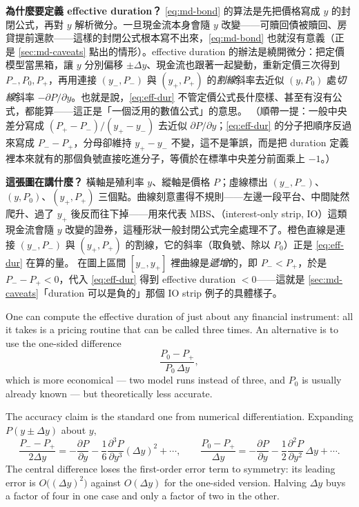 \suppstart
\begin{remark}
	\textbf{為什麼要定義 effective duration？} \eqref{eq:md-bond} 的算法是先把價格寫成 $y$ 的封閉公式，再對 $y$ 解析微分。一旦現金流本身會隨 $y$ 改變——可贖回債被贖回、房貸提前還款——這樣的封閉公式根本寫不出來，\eqref{eq:md-bond} 也就沒有意義（正是 \autoref{sec:md-caveats} 點出的情形）。effective duration 的辦法是繞開微分：把定價模型當黑箱，讓 $y$ 分別偏移 $\pm\Delta y$、現金流也跟著一起變動，重新定價三次得到 $P_{-},P_{0},P_{+}$，再用連接 $(y_{-},P_{-})$ 與 $(y_{+},P_{+})$ 的\emph{割線}斜率去近似 $(y,P_{0})$ 處\emph{切線}斜率 $-\partial P/\partial y$。也就是說，\eqref{eq:eff-dur} 不管定價公式長什麼樣、甚至有沒有公式，都能算——這正是「一個泛用的數值公式」的意思。
	（順帶一提：一般中央差分寫成 $(P_{+}-P_{-})/(y_{+}-y_{-})$ 去近似 $\partial P/\partial y$；\eqref{eq:eff-dur} 的分子把順序反過來寫成 $P_{-}-P_{+}$，分母卻維持 $y_{+}-y_{-}$ 不變，這不是筆誤，而是把 duration 定義裡本來就有的那個負號直接吃進分子，等價於在標準中央差分前面乘上 $-1$。）

	\textbf{這張圖在講什麼？} 橫軸是殖利率 $y$、縱軸是價格 $P$；虛線標出 $(y_{-},P_{-})$、$(y,P_{0})$、$(y_{+},P_{+})$ 三個點。曲線刻意畫得不規則——左邊一段平台、中間陡然爬升、過了 $y_{+}$ 後反而往下掉——用來代表 MBS、（interest-only strip, IO）這類現金流會隨 $y$ 改變的證券，這種形狀一般封閉公式完全處理不了。橙色直線是連接 $(y_{-},P_{-})$ 與 $(y_{+},P_{+})$ 的割線，它的斜率（取負號、除以 $P_{0}$）正是 \eqref{eq:eff-dur} 在算的量。
	在圖上區間 $[y_{-},y_{+}]$ 裡曲線是\emph{遞增}的，即 $P_{-}<P_{+}$，於是 $P_{-}-P_{+}<0$，代入 \eqref{eq:eff-dur} 得到 effective duration $<0$——這就是 \autoref{sec:md-caveats}「duration 可以是負的」那個 IO strip 例子的具體樣子。
\end{remark}
\suppend


One can compute the effective duration of just about any financial instrument: all it takes is a pricing routine that can be called three times.
An alternative is to use the one-sided difference
\begin{equation}
	\frac{P_{0}-P_{+}}{P_{0}\,\Delta y} , \label{eq:eff-dur-onesided}
\end{equation}
which is more economical --- two model runs instead of three, and $P_{0}$ is usually already known --- but theoretically less accurate.

\suppstart
\begin{note}
	The accuracy claim is the standard one from numerical differentiation.
	Expanding $P(y\pm\Delta y)$ about $y$,
	\[
		\frac{P_{-}-P_{+}}{2\Delta y} = -\frac{\partial P}{\partial y} - \frac{1}{6}\frac{\partial^{3}P}{\partial y^{3}}(\Delta y)^{2}+\cdots,
		\qquad
		\frac{P_{0}-P_{+}}{\Delta y} = -\frac{\partial P}{\partial y} - \frac{1}{2}\frac{\partial^{2}P}{\partial y^{2}}\,\Delta y+\cdots .
	\]
	The central difference loses the first-order error term to symmetry: its leading error is $O\bigl((\Delta y)^{2}\bigr)$ against $O(\Delta y)$ for the one-sided version.
	Halving $\Delta y$ buys a factor of four in one case and only a factor of two in the other.
\end{note}

